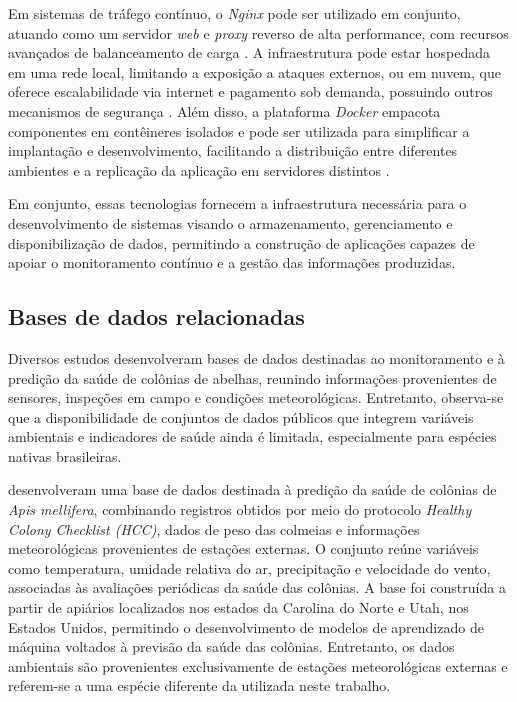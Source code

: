 \documentclass[12pt]{unisenaiclass}
\begin{document}
Em sistemas de tráfego contínuo, o \textit{Nginx} pode ser utilizado em conjunto, atuando como um servidor \textit{web} e \textit{proxy} reverso de alta performance, com recursos avançados de balanceamento de carga \cite{santosnginx2024}. A infraestrutura pode estar hospedada em uma rede local, limitando a exposição a ataques externos, ou em nuvem, que oferece escalabilidade via internet e pagamento sob demanda, possuindo outros mecanismos de segurança \cite{souzanuvem2009}. Além disso, a plataforma \textit{Docker} empacota componentes em contêineres isolados e pode ser utilizada para simplificar a implantação e desenvolvimento, facilitando a distribuição entre diferentes ambientes e a replicação da aplicação em servidores distintos \cite{santosnginx2024}.

Em conjunto, essas tecnologias fornecem a infraestrutura necessária para o desenvolvimento de sistemas visando o armazenamento, gerenciamento e disponibilização de dados, permitindo a construção de aplicações capazes de apoiar o monitoramento contínuo e a gestão das informações produzidas.

\subsection{Bases de dados relacionadas}

Diversos estudos desenvolveram bases de dados destinadas ao monitoramento e à predição da saúde de colônias de abelhas, reunindo informações provenientes de sensores, inspeções em campo e condições meteorológicas. Entretanto, observa-se que a disponibilidade de conjuntos de dados públicos que integrem variáveis ambientais e indicadores de saúde ainda é limitada, especialmente para espécies nativas brasileiras.

\cite{lowerpredicting2022} desenvolveram uma base de dados destinada à predição da saúde de colônias de \textit{Apis mellifera}, combinando registros obtidos por meio do protocolo \textit{Healthy Colony Checklist (HCC)}, dados de peso das colmeias e informações meteorológicas provenientes de estações externas. O conjunto reúne variáveis como temperatura, umidade relativa do ar, precipitação e velocidade do vento, associadas às avaliações periódicas da saúde das colônias. A base foi construída a partir de apiários localizados nos estados da Carolina do Norte e Utah, nos Estados Unidos, permitindo o desenvolvimento de modelos de aprendizado de máquina voltados à previsão da saúde das colônias. Entretanto, os dados ambientais são provenientes exclusivamente de estações meteorológicas externas e referem-se a uma espécie diferente da utilizada neste trabalho.
\end{document}
